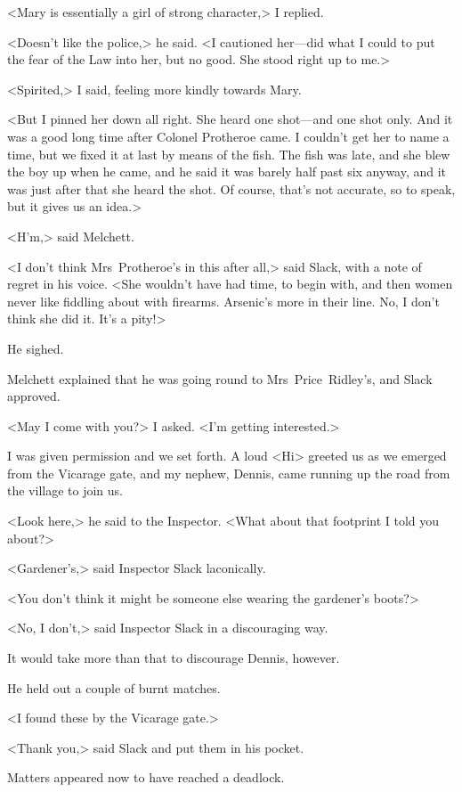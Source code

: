 <Mary is essentially a girl of strong character,> I replied.

<Doesn't like the police,> he said. <I cautioned her—did what I could to put the fear of the Law into her, but no good. She stood right up to me.>

<Spirited,> I said, feeling more kindly towards Mary.

<But I pinned her down all right. She heard one shot—and one shot only. And it was a good long time after Colonel Protheroe came. I couldn't get her to name a time, but we fixed it at last by means of the fish. The fish was late, and she blew the boy up when he came, and he said it was barely half past six anyway, and it was just after that she heard the shot. Of course, that's not accurate, so to speak, but it gives us an idea.>

<H'm,> said Melchett.

<I don't think Mrs~Protheroe's in this after all,> said Slack, with a note of regret in his voice. <She wouldn't have had time, to begin with, and then women never like fiddling about with firearms. Arsenic's more in their line. No, I don't think she did it. It's a pity!>

He sighed.

Melchett explained that he was going round to Mrs~Price~Ridley's, and Slack approved.

<May I come with you?> I asked. <I'm getting interested.>

I was given permission and we set forth. A loud <Hi> greeted us as we emerged from the Vicarage gate, and my nephew, Dennis, came running up the road from the village to join us.

<Look here,> he said to the Inspector. <What about that footprint I told you about?>

<Gardener's,> said Inspector Slack laconically.

<You don't think it might be someone else wearing the gardener's boots?>

<No, I don't,> said Inspector Slack in a discouraging way.

It would take more than that to discourage Dennis, however.

He held out a couple of burnt matches.

<I found these by the Vicarage gate.>

<Thank you,> said Slack and put them in his pocket.

Matters appeared now to have reached a deadlock.

